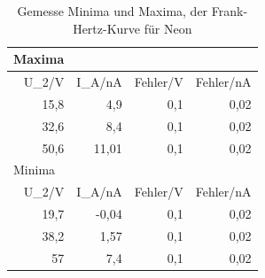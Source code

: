 \documentclass[12pt,a4paper]{article}
\begin{document}
\begin{table}[htbp]
\caption{Gemesse Minima und Maxima, der Frank-Hertz-Kurve für Neon}
\begin{center}
\begin{tabular}{|r|r|r|r|}
\hline
\multicolumn{1}{|l|}{Maxima} & \multicolumn{1}{l|}{} & \multicolumn{1}{l|}{} & \multicolumn{1}{l|}{} \\ \hline
U\_2/V & I\_A/nA & Fehler/V & Fehler/nA \\ \hline
15,8 & 4,9 & 0,1 & 0,02 \\ \hline
32,6 & 8,4 & 0,1 & 0,02 \\ \hline
50,6 & 11,01 & 0,1 & 0,02 \\ \hline
\multicolumn{1}{|l|}{Minima} & \multicolumn{1}{l|}{} & \multicolumn{1}{l|}{} & \multicolumn{1}{l|}{} \\ \hline
U\_2/V & I\_A/nA & Fehler/V & Fehler/nA \\ \hline
19,7 & -0,04 & 0,1 & 0,02 \\ \hline
38,2 & 1,57 & 0,1 & 0,02 \\ \hline
57 & 7,4 & 0,1 & 0,02 \\ \hline
\end{tabular}
\end{center}
\label{tab:n_m}
\end{table}
\end{document}
